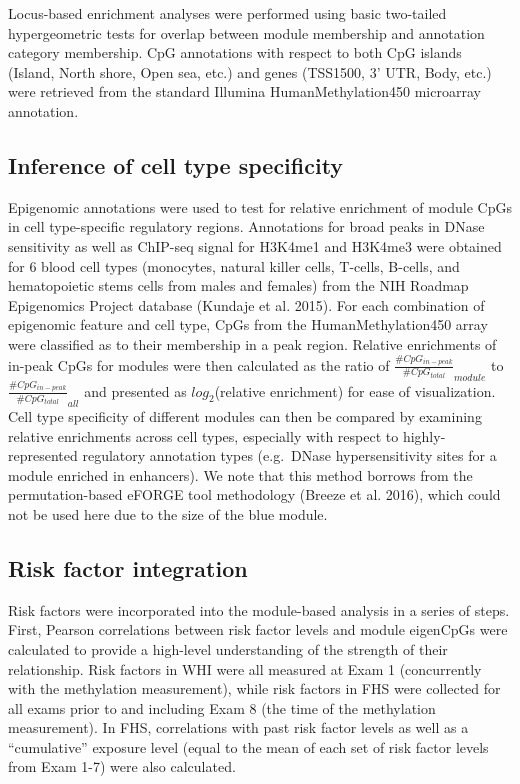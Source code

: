 \documentclass[]{article}
\theoremstyle{definition}
\theoremstyle{definition}
\theoremstyle{definition}
\theoremstyle{remark}
\begin{document}
Locus-based enrichment analyses were performed using basic two-tailed
hypergeometric tests for overlap between module membership and
annotation category membership. CpG annotations with respect to both CpG
islands (Island, North shore, Open sea, etc.) and genes (TSS1500, 3'
UTR, Body, etc.) were retrieved from the standard Illumina
HumanMethylation450 microarray annotation.

\subsection{Inference of cell type
specificity}\label{inference-of-cell-type-specificity}

Epigenomic annotations were used to test for relative enrichment of
module CpGs in cell type-specific regulatory regions. Annotations for
broad peaks in DNase sensitivity as well as ChIP-seq signal for H3K4me1
and H3K4me3 were obtained for 6 blood cell types (monocytes, natural
killer cells, T-cells, B-cells, and hematopoietic stems cells from males
and females) from the NIH Roadmap Epigenomics Project database (Kundaje
et al. 2015). For each combination of epigenomic feature and cell type,
CpGs from the HumanMethylation450 array were classified as to their
membership in a peak region. Relative enrichments of in-peak CpGs for
modules were then calculated as the ratio of
\(\frac{\#CpG_{in-peak}}{\#CpG_{total}}_{module}\) to
\(\frac{\#CpG_{in-peak}}{\#CpG_{total}}_{all}\) and presented as
\(log_2\)(relative enrichment) for ease of visualization. Cell type
specificity of different modules can then be compared by examining
relative enrichments across cell types, especially with respect to
highly-represented regulatory annotation types (e.g.~DNase
hypersensitivity sites for a module enriched in enhancers). We note that
this method borrows from the permutation-based eFORGE tool methodology
(Breeze et al. 2016), which could not be used here due to the size of
the blue module.

\subsection{Risk factor integration}\label{risk-factor-integration}

Risk factors were incorporated into the module-based analysis in a
series of steps. First, Pearson correlations between risk factor levels
and module eigenCpGs were calculated to provide a high-level
understanding of the strength of their relationship. Risk factors in WHI
were all measured at Exam 1 (concurrently with the methylation
measurement), while risk factors in FHS were collected for all exams
prior to and including Exam 8 (the time of the methylation measurement).
In FHS, correlations with past risk factor levels as well as a
``cumulative'' exposure level (equal to the mean of each set of risk
factor levels from Exam 1-7) were also calculated.
\end{document}
